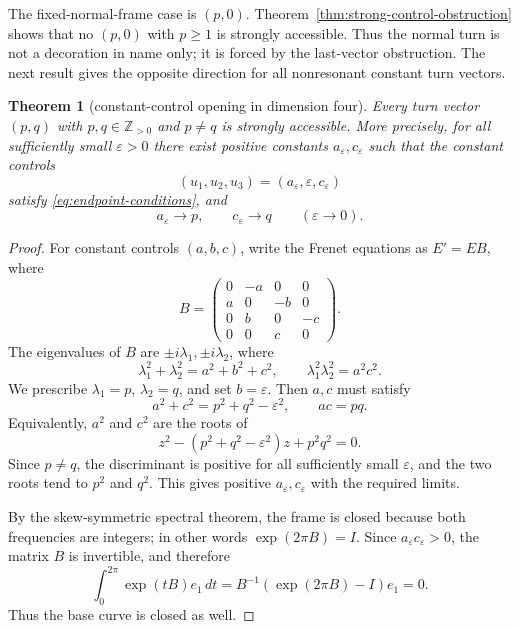 \documentclass[11pt,reqno]{amsart}
\newtheorem{theorem}{Theorem}[section]
\theoremstyle{definition}
\theoremstyle{remark}
\newcommand{\eps}{\varepsilon}
\begin{document}
The fixed-normal-frame case is $(p,0)$.  Theorem~\ref{thm:strong-control-obstruction}
shows that no $(p,0)$ with $p\ge1$ is strongly accessible.  Thus the normal turn is
not a decoration in name only; it is forced by the last-vector obstruction.  The next
result gives the opposite direction for all nonresonant constant turn vectors.

\begin{theorem}[constant-control opening in dimension four]\label{thm:constant-control-opening}
Every turn vector $(p,q)$ with $p,q\in\mathbb Z_{>0}$ and $p\ne q$ is strongly
accessible.  More precisely, for all sufficiently small $\eps>0$ there exist positive
constants $a_\eps,c_\eps$ such that the constant controls
\[
        (u_1,u_2,u_3)=(a_\eps,\eps,c_\eps)
\]
satisfy \eqref{eq:endpoint-conditions}, and
\[
        a_\eps\to p,
        \qquad
        c_\eps\to q
        \qquad(\eps\to0).
\]
\end{theorem}

\begin{proof}
For constant controls $(a,b,c)$, write the Frenet equations as $E'=EB$, where
\[
        B=\begin{pmatrix}
        0&-a&0&0\\
        a&0&-b&0\\
        0&b&0&-c\\
        0&0&c&0
        \end{pmatrix}.
\]
The eigenvalues of $B$ are $\pm i\lambda_1,\pm i\lambda_2$, where
\begin{equation}\label{eq:frequency-relations}
        \lambda_1^2+\lambda_2^2=a^2+b^2+c^2,
        \qquad
        \lambda_1^2\lambda_2^2=a^2c^2 .
\end{equation}
We prescribe $\lambda_1=p$, $\lambda_2=q$, and set $b=\eps$.  Then $a,c$ must
satisfy
\[
        a^2+c^2=p^2+q^2-\eps^2,
        \qquad
        ac=pq .
\]
Equivalently, $a^2$ and $c^2$ are the roots of
\[
        z^2-(p^2+q^2-\eps^2)z+p^2q^2=0 .
\]
Since $p\ne q$, the discriminant is positive for all sufficiently small $\eps$, and
the two roots tend to $p^2$ and $q^2$.  This gives positive $a_\eps,c_\eps$ with the
required limits.

By the skew-symmetric spectral theorem, the frame is closed because both frequencies
are integers; in other words $\exp(2\pi B)=I$.  Since $a_\eps c_\eps>0$, the matrix
$B$ is invertible, and therefore
\[
        \int_0^{2\pi}\exp(tB)e_1\,dt
        =B^{-1}(\exp(2\pi B)-I)e_1=0.
\]
Thus the base curve is closed as well.
\end{proof}
\end{document}
